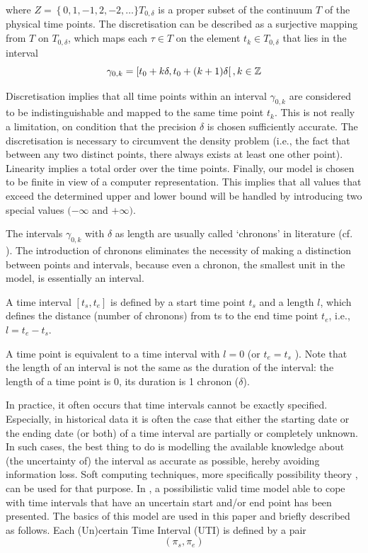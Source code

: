 where $Z = \left \lbrace 0, 1, -1, 2, -2, \ldots \rbrace \right. T_{0, \delta}$ is a proper subset of the continuum $T$ of the physical time points. The discretisation can be described as a surjective mapping from $T$ on $T_{0,\delta}$, which maps each $\tau \in T$ on the element $t_k \in T_{0,\delta}$ that lies in the interval
\begin{equation}
\gamma_{0,k} = \left[ t_0 + k\delta, t_0 + (k+1)\delta \right[, k \in \mathbb{Z} 
\end{equation}

Discretisation implies that all time points within an interval $\gamma_{0,k}$ are considered to be indistinguishable and mapped to the same time point $t_k$. This is not really a limitation, on condition that the precision $\delta$ is chosen sufficiently accurate. The discretisation is necessary to circumvent the density problem (i.e., the fact that between any two distinct points, there always exists at least one other point). Linearity implies a total order over the time points. Finally, our model is chosen to be finite in view of a computer representation. This implies that all values that exceed the determined upper and lower bound will be handled by introducing two special values $(- \infty $ and  $+\infty)$.

The intervals $\gamma_{0,k}$ with $\delta$ as length are usually called `chronons' in literature (cf. \cite{Dyreson1994}). The introduction of chronons eliminates the necessity of making a distinction between points and intervals, because even a chronon, the smallest unit in the model, is essentially an interval. 

A time interval $\left[t_s, t_e \right]$ is defined by a start time point $t_s$  and a length $l$, which defines the distance (number of chronons) from ts to the end time point $t_e$, i.e., $l = t_e - t_s$.


A time point is equivalent to a time interval with $l = 0$ (or $t_e = t_s$ ). Note that the length of an interval is not the same as the duration of the interval: the length of a time point is 0, its duration is 1 chronon ($\delta$). 

In practice, it often occurs that time intervals cannot be exactly specified. Especially, in historical data it is often the case that either the starting date or the ending date (or both) of a time interval are partially or completely unknown. In such cases, the best thing to do is modelling the available knowledge about (the uncertainty of) the interval as accurate as possible, hereby avoiding information loss. Soft computing techniques, more specifically possibility theory \cite{DidierDubois1988a}, can be used for that purpose. In \cite{Billiet2012}, \cite{JoseEnriquePons2012} a possibilistic valid time model able to cope with time intervals that have an uncertain start and/or end point has been presented. The basics of this model are used in this paper and briefly described as follows. Each (Un)certain Time Interval (UTI) is defined by a pair
\begin{equation}
 \label{eq:uncertain-time-interval}
\left(\pi_s, \pi_e \right)
\end{equation}

